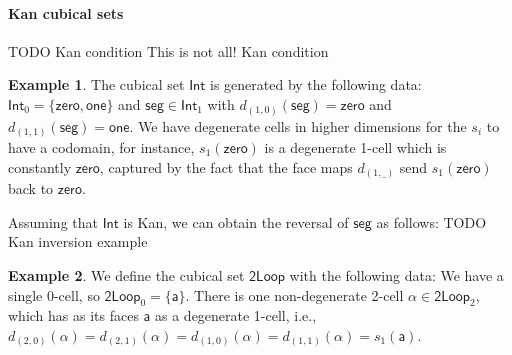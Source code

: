 \documentclass[11pt]{article}
\theoremstyle{definition}
\newtheorem{example}{Example}
\newcommand{\mdef}{:=}
\newcommand{\smap}[1]{s_{{#1}}}
\newcommand{\dmap}[2]{d_{({#1} , {#2})}}
\newcommand{\cset}[1]{\mathsf{{#1}}}
\newcommand{\comp}[2]{\mathsf{Comp}({#1}\ {#2})}
\begin{document}
\paragraph{Kan cubical sets}


TODO Kan condition
This is not all! Kan condition









\begin{example}\label{exp:int}
  The cubical set $\cset{Int}$ is generated by the following data: $\cset{Int}_0
  = \{ \cset{zero} , \cset{one} \}$ and $\cset{seg} \in \cset{Int}_1$ with
  $\dmap{1}{0}(\cset{seg}) = \cset{zero}$ and $\dmap{1}{1}(\cset{seg}) =
  \cset{one}$. We have degenerate cells in higher dimensions for the $\smap{i}$
  to have a codomain, for instance, $\smap{1}(\cset{zero})$ is a degenerate
  1-cell which is constantly $\cset{zero}$, captured by the fact that the face
  maps $\dmap{1}{\_}$ send
  $\smap{1}(\cset{zero})$ back to $\cset{zero}$.

  Assuming that $\cset{Int}$ is Kan, we can obtain the reversal of $\cset{seg}$
  as follows:
  TODO Kan inversion example
\end{example}

\begin{example}\label{exp:loopspace}
  We define the cubical set $\cset{2Loop}$ with the following data: We have a
  single 0-cell, so $\cset{2Loop}_0 = \{
  \cset{a} \}$. There is one non-degenerate 2-cell $\cset{\alpha} \in
  \cset{2Loop}_2$, which has as its faces $\cset{a}$ as a degenerate 1-cell, i.e.,
  $\dmap{2}{0}(\cset{\alpha}) = \dmap{2}{1}(\cset{\alpha}) =
  \dmap{1}{0}(\cset{\alpha}) = \dmap{1}{1}(\cset{\alpha}) = \smap{1} (\cset{a})$.
\end{example}
\end{document}
